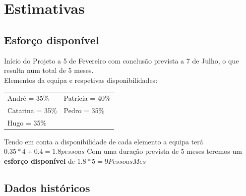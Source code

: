 \documentclass[a4paper]{report}
\begin{document}
\section{Estimativas}
\subsection{Esforço disponível}
Início do Projeto a 5 de Fevereiro com conclusão prevista a 7 de Julho, o que resulta num total de 5 meses.\\
Elementos da equipa e respetivas disponibilidades:\\

\begin{tabularx}{\textwidth}{XX}
	André = 35\%    & Patrícia = 40\% \\
	Catarina = 35\% & Pedro = 35\%    \\
	Hugo = 35\%     &
\end{tabularx}
\linebreak\linebreak
Tendo em conta a disponibilidade de cada elemento a equipa terá $0.35*4 + 0.4 =1.8 pessoas$\linebreak
Com uma duração prevista de 5 meses teremos um \textbf{esforço disponível} de $1.8*5=9 Pessoas Mes$
\subsection{Dados históricos}
\end{document}

